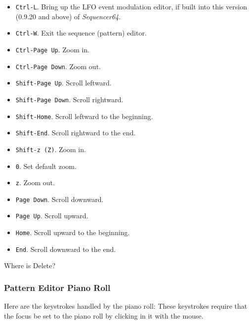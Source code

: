    \begin{itemize}
      \item \texttt{Ctrl-L}.  Bring up the LFO event modulation editor, if
         built into this version (0.9.20 and above) of \textsl{Sequencer64}.
      \item \texttt{Ctrl-W}.  Exit the sequence (pattern) editor.
      \item \texttt{Ctrl-Page Up}.  Zoom in.
      \item \texttt{Ctrl-Page Down}.  Zoom out.
      \item \texttt{Shift-Page Up}.  Scroll leftward.
      \item \texttt{Shift-Page Down}.  Scroll rightward.
      \item \texttt{Shift-Home}.  Scroll leftward to the beginning.
      \item \texttt{Shift-End}.  Scroll rightward to the end.
      \item \texttt{Shift-z (Z)}.  Zoom in.
      \item \texttt{0}.  Set default zoom.
      \item \texttt{z}.  Zoom out.
      \item \texttt{Page Down}.  Scroll downward.
      \item \texttt{Page Up}.  Scroll upward.
      \item \texttt{Home}.  Scroll upward to the beginning.
      \item \texttt{End}.  Scroll downward to the end.
   \end{itemize}

   Where is Delete?

\subsubsection{Pattern Editor Piano Roll}
\label{subsubsec:kbd_mouse_pattern_editor_piano_roll}

   Here are the keystrokes handled by the piano roll:
   These keystrokes require that the focus be set to the piano roll by clicking
   in it with the mouse.


